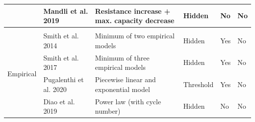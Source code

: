 \documentclass[journal=jpclcd,manuscript=article]{achemso}
\begin{document}
\begin{landscape}
\begin{table}
\begin{tabular}{|l|l|l|l|l|l|l|}
        \multicolumn{2}{|l|}{} & Mandli et al. 2019 \cite{mandli_analysis_2019} & Resistance increase + max. capacity decrease & Hidden & No & No \\ \hline
        \multicolumn{7}{c}{}  \\ \hline
        \multicolumn{2}{|l|}{\multirow{4}{*}{Empirical}} & Smith et al. 2014 \cite{smith_models_2014} & Minimum of two empirical models & Hidden & Yes & No \\ \cline{3-7} %
        \multicolumn{2}{|l|}{} & Smith et al. 2017 \cite{smith_life_2017} & Minimum of three empirical models & Hidden & Yes & No \\ \cline{3-7} %
        \multicolumn{2}{|l|}{} & Pugalenthi et al. 2020 \cite{pugalenthi_piecewise_2020} & Piecewise linear and exponential model & Threshold & Yes & No \\ \cline{3-7} %
        \multicolumn{2}{|l|}{} & Diao et al. 2019 \cite{diao_accelerated_2019} & Power law (with cycle number) & Hidden & No & No \\ \hline
    \end{tabular}
\end{table}

\end{landscape}
 \restoregeometry
\end{document}
